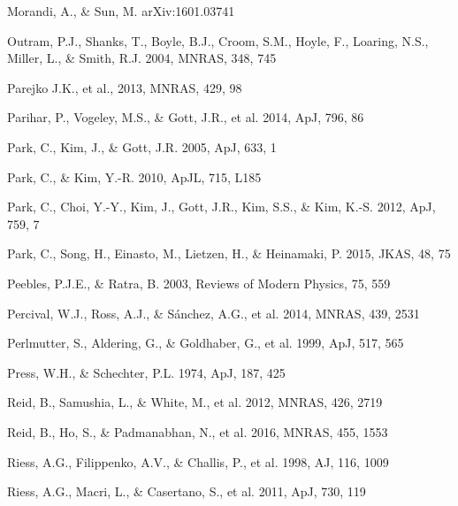 \documentclass[useAMS,usenatbib]{mnras}
\begin{document}
\begin{thebibliography}{}
Morandi, A., \& Sun, M. arXiv:1601.03741


Outram, P.J., Shanks, T., Boyle, B.J., Croom, S.M., Hoyle, F., Loaring, N.S., 
Miller, L., \& Smith, R.J. 2004, MNRAS, 348, 745  


Parejko J.K., et al., 2013, MNRAS, 429, 98

Parihar, P., Vogeley, M.S., \& Gott, J.R., et al. 2014, ApJ, 796, 86

Park, C., Kim, J., \& Gott, J.R. 2005, ApJ, 633, 1  

Park, C., \& Kim, Y.-R. 2010, ApJL, 715, L185  

Park, C., Choi, Y.-Y., Kim, J., Gott, J.R., Kim, S.S., \&
Kim, K.-S. 2012, ApJ, 759, 7

Park, C., Song, H., Einasto, M., Lietzen, H., \&
Heinamaki, P. 2015, JKAS, 48, 75

Peebles, P.J.E., \& Ratra, B. 2003, Reviews of Modern Physics, 75, 559

Percival, W.J., Ross, A.J., \& S\'{a}nchez, A.G., et al. 2014, MNRAS, 439, 2531

Perlmutter, S., Aldering, G., \& Goldhaber, G., et al. 1999, ApJ, 517, 565  

Press, W.H., \& Schechter, P.L. 1974, ApJ, 187, 425



Reid, B., Samushia, L., \& White, M., et al. 2012, MNRAS, 426, 2719  

Reid, B., Ho, S., \& Padmanabhan, N., et al.  2016, MNRAS, 455, 1553

Riess, A.G., Filippenko, A.V., \& Challis, P., et al. 1998, AJ, 116, 1009  

Riess, A.G., Macri, L., \& Casertano, S., et al. 2011, ApJ, 730, 119


\end{thebibliography}
\end{document}
